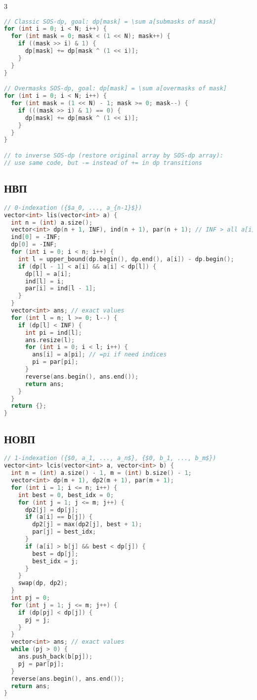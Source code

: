 \documentclass[9pt,a4paper,landscape,twosided]{extarticle}
\begin{document}
\begin{multicols*}{3}
\begin{lstlisting}[language=C++]
// Classic SOS-dp, goal: dp[mask] = \sum a[submasks of mask]
for (int i = 0; i < N; i++) {
  for (int mask = 0; mask < (1 << N); mask++) {
    if ((mask >> i) & 1) {
      dp[mask] += dp[mask ^ (1 << i)];
    }
  }
}

// Overmasks SOS-dp, goal: dp[mask] = \sum a[overmasks of mask]
for (int i = 0; i < N; i++) {
  for (int mask = (1 << N) - 1; mask >= 0; mask--) {
    if (((mask >> i) & 1) == 0) {
      dp[mask] += dp[mask ^ (1 << i)];
    }
  }
}

// to inverse SOS-dp (restore original array by SOS-dp array):
// use same code, but -= instead of += in dp transitions
\end{lstlisting}

\subsection{НВП}
\begin{lstlisting}[language=C++]
// 0-indexation ({$a_0, ..., a_{n-1}$})
vector<int> lis(vector<int> a) {
  int n = (int) a.size();
  vector<int> dp(n + 1, INF), ind(n + 1), par(n + 1); // INF > all a[i] required
  ind[0] = -INF;
  dp[0] = -INF;
  for (int i = 0; i < n; i++) {
    int l = upper_bound(dp.begin(), dp.end(), a[i]) - dp.begin();
    if (dp[l - 1] < a[i] && a[i] < dp[l]) {
      dp[l] = a[i];
      ind[l] = i;
      par[i] = ind[l - 1];
    }
  }
  vector<int> ans; // exact values
  for (int l = n; l >= 0; l--) {
    if (dp[l] < INF) {
      int pi = ind[l];
      ans.resize(l);
      for (int i = 0; i < l; i++) {
        ans[i] = a[pi]; // =pi if need indices
        pi = par[pi];
      }
      reverse(ans.begin(), ans.end());
      return ans;
    }
  }
  return {};
}
\end{lstlisting}

\subsection{НОВП}
\begin{lstlisting}[language=C++]
// 1-indexation ({$0, a_1, ..., a_n$}, {$0, b_1, ..., b_m$})
vector<int> lcis(vector<int> a, vector<int> b) {
  int n = (int) a.size() - 1, m = (int) b.size() - 1;
  vector<int> dp(m + 1), dp2(m + 1), par(m + 1);
  for (int i = 1; i <= n; i++) {
    int best = 0, best_idx = 0;
    for (int j = 1; j <= m; j++) {
      dp2[j] = dp[j];
      if (a[i] == b[j]) {
        dp2[j] = max(dp2[j], best + 1);
        par[j] = best_idx;
      }
      if (a[i] > b[j] && best < dp[j]) {
        best = dp[j];
        best_idx = j;
      }
    }
    swap(dp, dp2);
  }
  int pj = 0;
  for (int j = 1; j <= m; j++) {
    if (dp[pj] < dp[j]) {
      pj = j;
    }
  }
  vector<int> ans; // exact values
  while (pj > 0) {
    ans.push_back(b[pj]);
    pj = par[pj];
  }
  reverse(ans.begin(), ans.end());
  return ans;
}
\end{lstlisting}


\end{multicols*}
\end{document}
